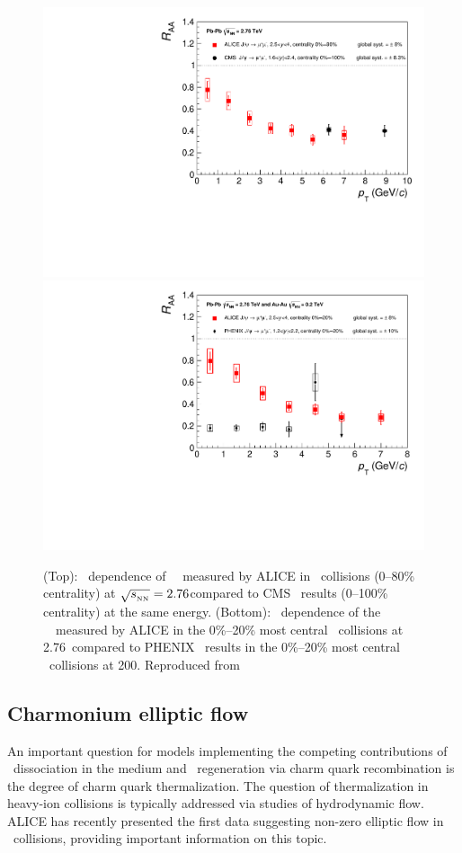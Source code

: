 \begin{figure}[h!]
\begin{center}
\includegraphics[width=0.49\linewidth,keepaspectratio]{qqbarfigures/RAAPtvsModels1.pdf}
\includegraphics[width=0.49\linewidth,keepaspectratio]{qqbarfigures/RAAPtvsModels2.pdf}
\caption{ \label{fig:GR:raaexp2}
(Top): \pT\ dependence of \jpsi\ \Raa\ measured by ALICE in \PbPb\
collisions (0--80\% centrality) at $\sqrt{s_{_{\rm NN}}} = 2.76$\TeV compared to CMS~\cite{Chatrchyan:2012np}
results (0--100\% centrality) at the same energy.
(Bottom): \pT\ dependence of the \jpsi\ \Raa\ measured by ALICE in the 0\%--20\% most
central \PbPb\ collisions at 2.76\TeV\ compared to PHENIX~\cite{Adare:2011yf}
results in the 0\%--20\% most central \AuAu\ collisions at 200\GeV. Reproduced from~\cite{Abelev:2013ila}}
\end{center}
\end{figure}


\subsection{Charmonium elliptic flow}

An important question for models implementing the competing contributions of
\jpsi\ dissociation in the medium and \jpsi\ regeneration via charm quark recombination is
the degree of charm quark thermalization. The question of thermalization in heavy-ion collisions is typically addressed
via studies of hydrodynamic flow. ALICE has recently presented the first data suggesting non-zero elliptic flow
in \PbPb\ collisions, providing important information on this topic.

